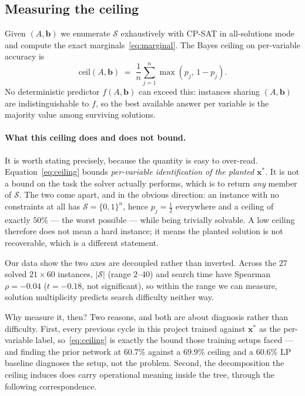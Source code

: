 \documentclass[12pt]{article}
\begin{document}
\subsection{Measuring the ceiling}
\label{sec:m-ceiling}

Given $(A,\mathbf{b})$ we enumerate $\mathcal{S}$ exhaustively with CP-SAT in all-solutions mode and compute the exact marginals~\eqref{eq:marginal}. The Bayes ceiling on per-variable accuracy is
\begin{equation}
\mathrm{ceil}(A,\mathbf{b}) \;=\; \frac{1}{n}\sum_{j=1}^{n} \max(p_j,\,1-p_j).
\label{eq:ceiling}
\end{equation}
No deterministic predictor $f(A,\mathbf{b})$ can exceed this: instances sharing $(A,\mathbf{b})$ are indistinguishable to $f$, so the best available answer per variable is the majority value among surviving solutions.

\paragraph{What this ceiling does and does not bound.} It is worth stating precisely, because the quantity is easy to over-read. Equation~\eqref{eq:ceiling} bounds \emph{per-variable identification of the planted $\mathbf{x}^\ast$}. It is not a bound on the task the solver actually performs, which is to return \emph{any} member of $\mathcal{S}$. The two come apart, and in the obvious direction: an instance with no constraints at all has $\mathcal{S}=\{0,1\}^n$, hence $p_j=\tfrac12$ everywhere and a ceiling of exactly $50\%$ --- the worst possible --- while being trivially solvable. A low ceiling therefore does not mean a hard instance; it means the planted solution is not recoverable, which is a different statement.

Our data show the two axes are decoupled rather than inverted. Across the $27$ solved $21\times60$ instances, $|\mathcal{S}|$ (range $2$--$40$) and search time have Spearman $\rho=-0.04$ ($t=-0.18$, not significant), so within the range we can measure, solution multiplicity predicts search difficulty neither way.

Why measure it, then? Two reasons, and both are about diagnosis rather than difficulty. First, every previous cycle in this project trained against $\mathbf{x}^\ast$ as the per-variable label, so~\eqref{eq:ceiling} is exactly the bound those training setups faced --- and finding the prior network at $60.7\%$ against a $69.9\%$ ceiling and a $60.6\%$ LP baseline diagnoses the setup, not the problem. Second, the decomposition the ceiling induces does carry operational meaning inside the tree, through the following correspondence.
\end{document}
